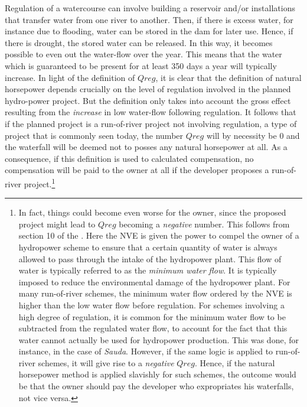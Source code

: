 Regulation of a watercourse can involve building a reservoir and/or installations that transfer water from one river to another. Then, if there is excess water, for instance due to flooding, water can be stored in the dam for later use. Hence, if there is drought, the stored water can be released. In this way, it becomes possible to even out the water-flow over the year. This means that the water which is guaranteed to be present for at least 350 days a year will typically increase. In light of the definition of $Qreg$, it is clear that the definition of natural horsepower depends crucially on the level of regulation involved in the planned hydro-power project. 
But the definition only takes into account the gross effect resulting from the \emph{increase} in low water-flow following regulation. 
It follows that if the planned project is a run-of-river project not involving regulation, a type of project that is commonly seen today, the number $Qreg$ will by necessity be $0$ and the waterfall will be deemed not to posses any natural horsepower at all. As a consequence, if this definition is used to calculated compensation, no compensation will be paid to the owner at all if the developer proposes a run-of-river project.\footnote{In fact, things could become even worse for the owner, since the proposed project might lead to $Qreg$ becoming a {\it negative} number. This follows from section 10 of the \cite{wra00}. Here the NVE is given the power to compel the owner of a hydropower scheme to ensure that a certain quantity of water is always allowed to pass through the intake of the hydropower plant. This flow of water is typically referred to as the {\it minimum water flow}. It is typically imposed to reduce the environmental damage of the hydropower plant. For many run-of-river schemes, the minimum water flow ordered by the NVE is higher than the low water flow before regulation. For schemes involving a high degree of regulation, it is common for the minimum water flow to be subtracted from the regulated water flow, to account for the fact that this water cannot actually be used for hydropower production. This was done, for instance, in the case of {\it Sauda}. However, if the same logic is applied to run-of-river schemes, it will give rise to a {\it negative} $Qreg$. Hence, if the natural horsepower method is applied slavishly for such schemes, the outcome would be that the owner should pay the developer who expropriates his waterfalls, not vice versa.}

